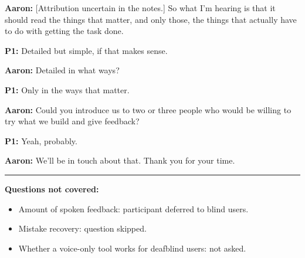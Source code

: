 \textbf{Aaron:} [Attribution uncertain in the notes.] So what I'm hearing is that it should read the things that matter, and only those, the things that actually have to do with getting the task done.

\textbf{P1:} Detailed but simple, if that makes sense.

\textbf{Aaron:} Detailed in what ways?

\textbf{P1:} Only in the ways that matter.

\textbf{Aaron:} Could you introduce us to two or three people who would be willing to try what we build and give feedback?

\textbf{P1:} Yeah, probably.

\textbf{Aaron:} We'll be in touch about that. Thank you for your time.

\bigskip
\hrule
\bigskip

\textbf{Questions not covered:}
\begin{itemize}
    \item Amount of spoken feedback: participant deferred to blind users.
    \item Mistake recovery: question skipped.
    \item Whether a voice-only tool works for deafblind users: not asked.
\end{itemize}
